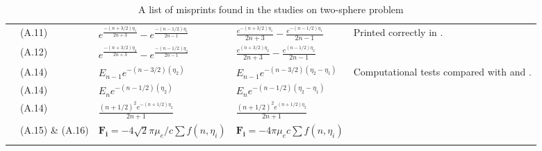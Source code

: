 \documentclass[../thesis.tex]{subfiles}
\begin{document}
\begin{landscape}
\begin{longtable}{p{3cm}p{3cm}p{5.0cm}p{5.25cm}p{5.5cm}}
 \multirow[t]{6}{3cm}{\cite{RSD22}} & (A.11) & $e^{\frac{-(n+3/2)\eta_1}{2n+3}}-e^{\frac{-(n-1/2)\eta_1}{2n-1}}$ & $\frac{e^{-(n+3/2)\eta_1}}{2n+3}-\frac{e^{-(n-1/2)\eta_1}}{2n-1}$ & \multirow[c]{2}{5.5cm}{Printed correctly in \cite{R09}.}
 \\ \cline{2-4}
 & (A.12) & $e^{\frac{-(n+3/2)\eta_2}{2n+3}}-e^{\frac{-(n-1/2)\eta_2}{2n-1}}$ & $\frac{e^{(n+3/2)\eta_2}}{2n+3}-\frac{e^{(n-1/2)\eta_2}}{2n-1}$ & 
 \\ \cline{2-5}
 & (A.14) & $E_{n-1}e^{-(n-3/2)(\eta_2)}$ & $E_{n-1}e^{-(n-3/2)(\eta_2-\eta_1)}$ & \multirow[t]{4}{5.5cm}{Computational tests compared with \cite{HHS73} and \cite{RM74}.}
 \\ \cline{2-4}
 & (A.14) & $E_{n}e^{-(n-1/2)(\eta_2)}$ & $E_{n}e^{-(n-1/2)(\eta_2-\eta_1)}$ &
 \\ \cline{2-4}
 & (A.14) & $\frac{(n+1/2)^2 e^{-(n+1/2)\eta_2}}{2n+1}$ & $\frac{(n+1/2)^2 e^{(n+1/2)\eta_2}}{2n+1}$ &
 \\ \cline{2-4}
 & (A.15) \& (A.16) & $\boldsymbol{F_i}=-4\sqrt{2}\pi\mu_e/c \sum f(n,\eta_i)$ & $\boldsymbol{F_i}=-4\pi\mu_e c \sum f(n,\eta_i)$ &
 \\ \hline
\caption{A list of misprints found in the studies on two-sphere problem}
\label{tab:misprints}
\end{longtable}%

\end{landscape}
\end{document}

